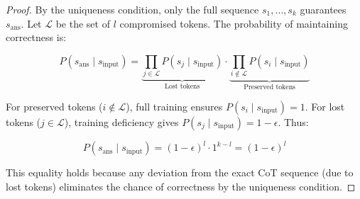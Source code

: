 \begin{proof}
By the uniqueness condition, only the full sequence $s_1, \dots, s_k$ guarantees $s_{\text{ans}}$. Let $\mathcal{L}$ be the set of $l$ compromised tokens. The probability of maintaining correctness is:

\[
P(s_{\text{ans}} \mid s_{\text{input}}) = \underbrace{\prod_{j \in \mathcal{L}} P(s_j \mid s_{\text{input}})}_{\text{Lost tokens}} \cdot \underbrace{\prod_{i \notin \mathcal{L}} P(s_i \mid s_{\text{input}})}_{\text{Preserved tokens}}
\]

For preserved tokens ($i \notin \mathcal{L}$), full training ensures $P(s_i \mid s_{\text{input}}) = 1$. For lost tokens ($j \in \mathcal{L}$), training deficiency gives $P(s_j \mid s_{\text{input}}) = 1 - \epsilon$. Thus:

\[
P(s_{\text{ans}} \mid s_{\text{input}}) = (1 - \epsilon)^l \cdot 1^{k-l} = (1 - \epsilon)^l
\]

This equality holds because any deviation from the exact CoT sequence (due to lost tokens) eliminates the chance of correctness by the uniqueness condition.
\end{proof}